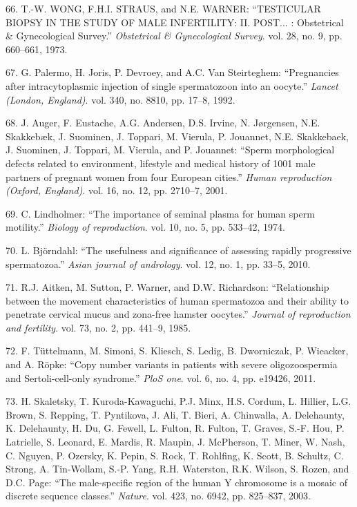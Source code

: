 \documentclass[12pt,a4paper,twoside]{ugathesis}
\theoremstyle{definition}
\theoremstyle{definition}
\theoremstyle{definition}
\theoremstyle{remark}
\begin{document}
\hypertarget{ref-WONG1973}{}
66. T.-W. WONG, F.H.I. STRAUS, and N.E. WARNER: ``TESTICULAR BIOPSY IN
THE STUDY OF MALE INFERTILITY: II. POST... : Obstetrical \&
Gynecological Survey.'' \emph{Obstetrical \& Gynecological Survey}. vol.
28, no. 9, pp. 660--661, 1973.

\hypertarget{ref-Palermo1992}{}
67. G. Palermo, H. Joris, P. Devroey, and A.C. Van Steirteghem:
``Pregnancies after intracytoplasmic injection of single spermatozoon
into an oocyte.'' \emph{Lancet (London, England)}. vol. 340, no. 8810,
pp. 17--8, 1992.

\hypertarget{ref-Auger2001}{}
68. J. Auger, F. Eustache, A.G. Andersen, D.S. Irvine, N. Jørgensen,
N.E. Skakkebæk, J. Suominen, J. Toppari, M. Vierula, P. Jouannet, N.E.
Skakkebaek, J. Suominen, J. Toppari, M. Vierula, and P. Jouannet:
``Sperm morphological defects related to environment, lifestyle and
medical history of 1001 male partners of pregnant women from four
European cities.'' \emph{Human reproduction (Oxford, England)}. vol. 16,
no. 12, pp. 2710--7, 2001.

\hypertarget{ref-Lindholmer1974}{}
69. C. Lindholmer: ``The importance of seminal plasma for human sperm
motility.'' \emph{Biology of reproduction}. vol. 10, no. 5, pp. 533--42,
1974.

\hypertarget{ref-Bjorndahl2010}{}
70. L. Björndahl: ``The usefulness and significance of assessing rapidly
progressive spermatozoa.'' \emph{Asian journal of andrology}. vol. 12,
no. 1, pp. 33--5, 2010.

\hypertarget{ref-Aitken1985}{}
71. R.J. Aitken, M. Sutton, P. Warner, and D.W. Richardson:
``Relationship between the movement characteristics of human spermatozoa
and their ability to penetrate cervical mucus and zona-free hamster
oocytes.'' \emph{Journal of reproduction and fertility}. vol. 73, no. 2,
pp. 441--9, 1985.

\hypertarget{ref-Tuttelmann2011}{}
72. F. Tüttelmann, M. Simoni, S. Kliesch, S. Ledig, B. Dworniczak, P.
Wieacker, and A. Röpke: ``Copy number variants in patients with severe
oligozoospermia and Sertoli-cell-only syndrome.'' \emph{PloS one}. vol.
6, no. 4, pp. e19426, 2011.

\hypertarget{ref-Skaletsky2003}{}
73. H. Skaletsky, T. Kuroda-Kawaguchi, P.J. Minx, H.S. Cordum, L.
Hillier, L.G. Brown, S. Repping, T. Pyntikova, J. Ali, T. Bieri, A.
Chinwalla, A. Delehaunty, K. Delehaunty, H. Du, G. Fewell, L. Fulton, R.
Fulton, T. Graves, S.-F. Hou, P. Latrielle, S. Leonard, E. Mardis, R.
Maupin, J. McPherson, T. Miner, W. Nash, C. Nguyen, P. Ozersky, K.
Pepin, S. Rock, T. Rohlfing, K. Scott, B. Schultz, C. Strong, A.
Tin-Wollam, S.-P. Yang, R.H. Waterston, R.K. Wilson, S. Rozen, and D.C.
Page: ``The male-specific region of the human Y chromosome is a mosaic
of discrete sequence classes.'' \emph{Nature}. vol. 423, no. 6942, pp.
825--837, 2003.
\end{document}
